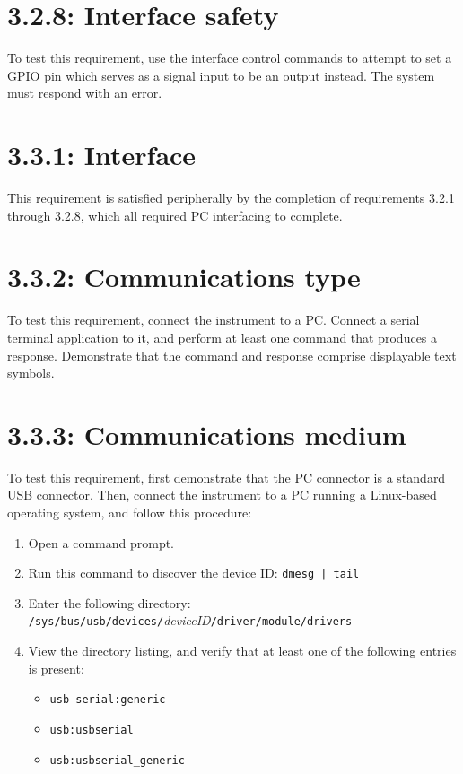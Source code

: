 \section*{3.2.8: Interface safety}
\label{tp:3.2.8}
To test this requirement, use the interface control commands to attempt to set a GPIO pin
which serves as a signal input to be an output instead. The system must respond with an error.

\section*{3.3.1: Interface}
This requirement is satisfied peripherally by the completion of requirements \hyperref[tp:3.2.1]{3.2.1}
through \hyperref[tp:3.2.8]{3.2.8}, which all required PC interfacing to complete.

\section*{3.3.2: Communications type}
To test this requirement, connect the instrument to a PC. Connect a serial terminal application
to it, and perform at least one command that produces a response. Demonstrate that the
command and response comprise displayable text symbols.

\section*{3.3.3: Communications medium}
To test this requirement, first demonstrate that the PC connector is a standard
USB connector. Then, connect the instrument to a PC running a Linux-based
operating system, and follow this procedure:

\begin{enumerate}
\item{Open a command prompt.}
\item{Run this command to discover the device ID: \texttt{dmesg | tail}}
\item{Enter the following directory: \texttt{/sys/bus/usb/devices/}\emph{deviceID}\texttt{/driver/module/drivers}}
\item{View the directory listing, and verify that at least one of the following entries is present:
    \begin{itemize}
    \item{\texttt{usb-serial:generic}}
    \item{\texttt{usb:usbserial}}
    \item{\texttt{usb:usbserial\_generic}}
    \end{itemize}
}
\end{enumerate}

